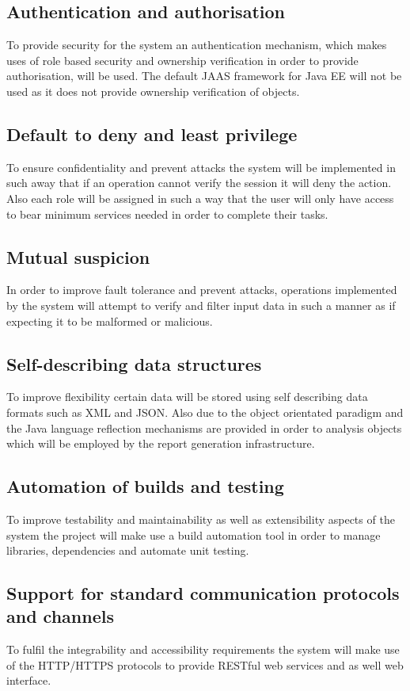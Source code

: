 \documentclass[12pt]{article}
\begin{document}
\subsection{Authentication and authorisation}
To provide security for the system an authentication mechanism, which makes uses of role based security and ownership verification in order to provide authorisation, will be used. The default JAAS framework for Java EE will not be used as it does not provide ownership verification of objects.

\subsection{Default to deny and least privilege}
To ensure confidentiality and prevent attacks the system will be implemented in such away that if an operation cannot verify the session it will deny the action. Also each role will be assigned in such a way that the user will only have access to bear minimum services needed in order to complete their tasks.

\subsection{Mutual suspicion}
In order to improve fault tolerance and prevent attacks, operations implemented by the system will attempt to verify and filter input data in such a manner as if expecting it to be malformed or malicious.

\subsection{Self-describing data structures}
To improve flexibility certain data will be stored using self describing data formats such as XML and JSON. Also due to the object orientated paradigm and the Java language reflection mechanisms are provided in order to analysis objects which will be employed by the report generation infrastructure.

\subsection{Automation of builds and testing}
To improve testability and maintainability as well as extensibility aspects of the system the project will make use a build automation tool in order to manage libraries, dependencies and automate unit testing.

\subsection{Support for standard communication protocols and channels}
To fulfil the integrability and accessibility requirements the system will make use of the HTTP/HTTPS protocols to provide RESTful web services and as well web interface. 
\end{document}
